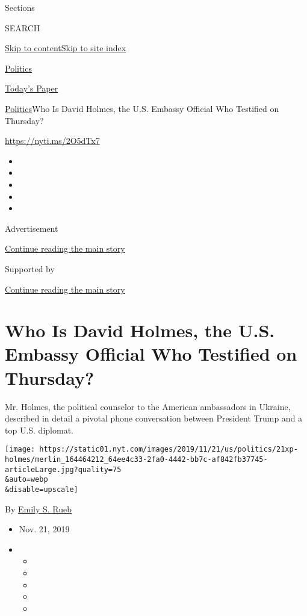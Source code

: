 Sections

SEARCH

\protect\hyperlink{site-content}{Skip to
content}\protect\hyperlink{site-index}{Skip to site index}

\href{https://www.nytimes.com/section/politics}{Politics}

\href{https://myaccount.nytimes.com/auth/login?response_type=cookie\&client_id=vi}{}

\href{https://www.nytimes.com/section/todayspaper}{Today's Paper}

\href{/section/politics}{Politics}\textbar{}Who Is David Holmes, the
U.S. Embassy Official Who Testified on Thursday?

\url{https://nyti.ms/2O5dTx7}

\begin{itemize}
\item
\item
\item
\item
\item
\end{itemize}

Advertisement

\protect\hyperlink{after-top}{Continue reading the main story}

Supported by

\protect\hyperlink{after-sponsor}{Continue reading the main story}

\hypertarget{who-is-david-holmes-the-us-embassy-official-who-testified-on-thursday}{%
\section{Who Is David Holmes, the U.S. Embassy Official Who Testified on
Thursday?}\label{who-is-david-holmes-the-us-embassy-official-who-testified-on-thursday}}

Mr. Holmes, the political counselor to the American ambassadors in
Ukraine, described in detail a pivotal phone conversation between
President Trump and a top U.S. diplomat.

\texttt{[image: https://static01.nyt.com/images/2019/11/21/us/politics/21xp-holmes/merlin\_164464212\_64ee4c33-2fa0-4442-bb7c-af842fb37745-articleLarge.jpg?quality=75\\\&auto=webp\\\&disable=upscale]}

By \href{https://www.nytimes.com/by/emily-s-rueb}{Emily S. Rueb}

\begin{itemize}
\item
  Nov. 21, 2019
\item
  \begin{itemize}
  \item
  \item
  \item
  \item
  \item
  \end{itemize}
\end{itemize}

